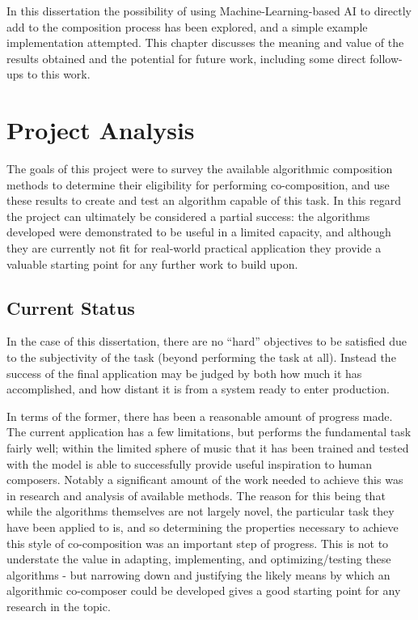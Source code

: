 \documentclass[ author={Stephen Livermore-Tozer},
				supervisor={Dr. Peter Flach},
				degree={MEng},
				title={Algorithmic Co-composition Using Machine Learning},
				subtitle={},
				type={research},
				year={2016} ]{dissertation}
\begin{document}
	In this dissertation the possibility of using Machine-Learning-based AI to directly add to the composition process has been explored, and a simple example implementation attempted. This chapter discusses the meaning and value of the results obtained and the potential for future work, including some direct follow-ups to this work.
	
	\section{Project Analysis}
	\label{sec:project-analysis}
	
	The goals of this project were to survey the available algorithmic composition methods to determine their eligibility for performing co-composition, and use these results to create and test an algorithm capable of this task. In this regard the project can ultimately be considered a partial success: the algorithms developed were demonstrated to be useful in a limited capacity, and although they are currently not fit for real-world practical application they provide a valuable starting point for any further work to build upon.
	
	\subsection{Current Status}
	\label{sec:project-status}
	
	In the case of this dissertation, there are no ``hard'' objectives to be satisfied due to the subjectivity of the task (beyond performing the task at all). Instead the success of the final application may be judged by both how much it has accomplished, and how distant it is from a system ready to enter production.
	
	In terms of the former, there has been a reasonable amount of progress made. The current application has a few limitations, but performs the fundamental task fairly well; within the limited sphere of music that it has been trained and tested with the model is able to successfully provide useful inspiration to human composers. Notably a significant amount of the work needed to achieve this was in research and analysis of available methods. The reason for this being that while the algorithms themselves are not largely novel, the particular task they have been applied to is, and so determining the properties necessary to achieve this style of co-composition was an important step of progress. This is not to understate the value in adapting, implementing, and optimizing/testing these algorithms - but narrowing down and justifying the likely means by which an algorithmic co-composer could be developed gives a good starting point for any research in the topic.
	
\end{document}
